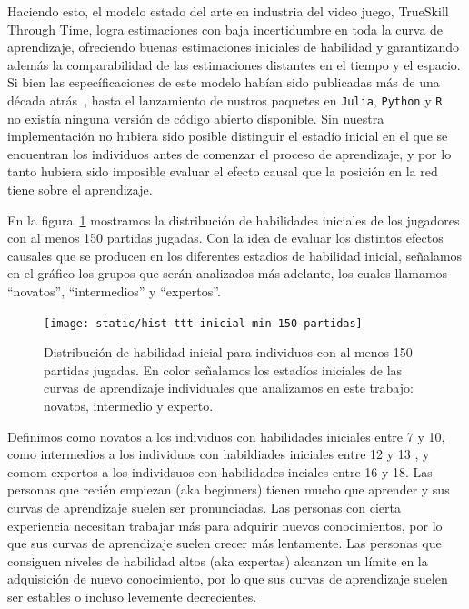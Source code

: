 \documentclass[a4paper,11pt]{book}
\theoremstyle{definition}
\begin{document}
Haciendo esto, el modelo estado del arte en industria del video juego, TrueSkill Through Time, logra estimaciones con baja incertidumbre en toda la curva de aprendizaje, ofreciendo buenas estimaciones iniciales de habilidad y garantizando además la comparabilidad de las estimaciones distantes en el tiempo y el espacio.
%
Si bien las específicaciones de este modelo habían sido publicadas más de una década atrás~\cite{Dangauthier2007}, hasta el lanzamiento de nustros paquetes en \texttt{Julia}, \texttt{Python} y \texttt{R}~\cite{Landfried2021-TTT} no existía ninguna versión de código abierto disponible.
%
Sin nuestra implementación no hubiera sido posible distinguir el estadío inicial en el que se encuentran los individuos antes de comenzar el proceso de aprendizaje, y por lo tanto hubiera sido imposible evaluar el efecto causal que la posición en la red tiene sobre el aprendizaje.

En la figura~\ref{Figuras.HistogramaTTTInicial} mostramos la distribución de habilidades iniciales de los jugadores con al menos 150 partidas jugadas.
%
Con la idea de evaluar los distintos efectos causales que se producen en los diferentes estadios de habilidad inicial, señalamos en el gráfico los grupos que serán analizados más adelante, los cuales llamamos ``novatos'', ``intermedios'' y ``expertos''.
%
\begin{figure}[ht!]
 	\centering
	\texttt{[image: static/hist-ttt-inicial-min-150-partidas]}
	\caption{
	Distribución de habilidad inicial para individuos con al menos 150 partidas jugadas. En color señalamos los estadíos iniciales de las curvas de aprendizaje individuales que analizamos en este trabajo: novatos, intermedio y experto.
	}
	\label{Figuras.HistogramaTTTInicial}
 \end{figure}
%
Definimos como novatos a los individuos con habilidades iniciales entre 7 y 10, como intermedios a los individuos con habildiades iniciales entre 12 y 13 , y comom expertos a los individsuos con habilidades inciales entre 16 y 18.
%
Las personas que recién empiezan (aka beginners) tienen mucho que aprender y sus curvas de aprendizaje suelen ser pronunciadas.
%
Las personas con cierta experiencia necesitan trabajar más para adquirir nuevos conocimientos, por lo que sus curvas de aprendizaje suelen crecer más lentamente.
%
Las personas que consiguen niveles de habilidad altos (aka expertas) alcanzan un límite en la adquisición de nuevo conocimiento, por lo que sus curvas de aprendizaje suelen ser estables o incluso levemente decrecientes.
%
%
\end{document}
